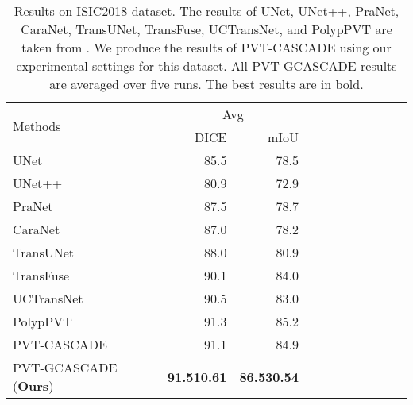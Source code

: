 \documentclass[10pt,twocolumn,letterpaper]{article}
\begin{document}
\begin{table}[]
\begin{center}
    {\small{
\begin{tabular}{lrrrrrrrrrr}
\toprule
\multirow{2}{*}{Methods}        & \multicolumn{2}{c}{Avg} \\
                               & DICE         & mIoU           \\
\midrule
UNet \cite{ronneberger2015u} & 85.5       & 78.5          \\
UNet++ \cite{zhou2018unet++} & 80.9      & 72.9          \\
PraNet \cite{fan2020pranet} & 87.5       & 78.7       \\
CaraNet \cite{lou2022caranet} & 87.0      & 78.2      \\
TransUNet \cite{chen2021transunet}                   & 88.0       & 80.9       \\
TransFuse \cite{zhang2021transfuse}                   & 90.1       & 84.0       \\
UCTransNet \cite{wang2022uctransnet}                   & 90.5       & 83.0       \\
PolypPVT \cite{dong2021polyp}                      & 91.3       & 85.2       \\
PVT-CASCADE  \cite{Rahman_2023_WACV}                 &  91.1       & 84.9     \\
\midrule
PVT-GCASCADE (\textbf{Ours})                   &  \textbf{91.510.61}       & \textbf{86.530.54}     \\

\bottomrule \end{tabular}
}}
\end{center}
\caption{Results on ISIC2018 dataset. The results of UNet, UNet++, PraNet, CaraNet, TransUNet, TransFuse, UCTransNet, and PolypPVT are taken from \cite{tang2022duat}. We produce the results of PVT-CASCADE using our experimental settings for this dataset. All PVT-GCASCADE results are averaged over five runs. The best results are in bold.} \label{tab:isic2018_results}
\end{table}
\end{document}

